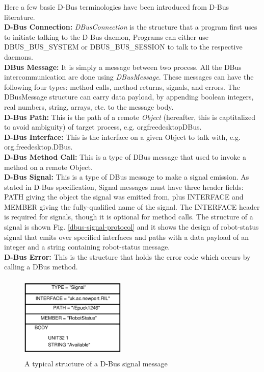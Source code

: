 \documentclass{ifacconf}
\begin{document}
Here a few basic D-Bus terminologies have been   introduced from D-Bus literature.\\
\textbf{D-Bus Connection: }
\textit{DBusConnection} is the structure that a program first uses to initiate talking to the D-Bus daemon,  Programs can either use DBUS\_BUS\_SYSTEM or DBUS\_BUS\_SESSION to talk to the respective daemons.\\
\textbf{DBus Message: }
It is simply a message between two process. All the DBus intercommunication are done using \textit{DBusMessage}. These messages can have the following four types: method calls, method returns, signals, and errors. The DBusMessage structure can carry data payload, by appending boolean integers, real numbers, string, arrays, etc. to the message body.\\ 
\textbf{D-Bus Path: }
This is the path of a remote \textit{Object} (hereafter, this is captitalized to avoid ambiguity) of target process, e.g.  \/org\/freedesktop\/DBus.\\
\textbf{D-Bus Interface: }
This is the interface on a given Object to talk with, e.g. org.freedesktop.DBus.\\
\textbf{D-Bus Method Call: }
This is a type  of DBus message that used to invoke a method on a remote Object.\\
\textbf{D-Bus Signal: }
This is a type of DBus message to make a signal emission.  As stated in D-Bus specification, Signal messages must have three header fields: PATH giving the object the signal was emitted from, plus INTERFACE and MEMBER giving the fully-qualified name of the signal. The INTERFACE header is required for signals, though it is optional for method calls. The structure of a signal is shown Fig. \ref{dbus-signal-protocol} and  it shows the design of robot-status signal that emits over specified interfaces and paths with a data payload of an integer and a string containing robot-status message.\\
\textbf{D-Bus Error: }
This is the structure that holds the error code which occurs by calling a DBus method.
\begin{figure}
\begin{center}
\includegraphics[width=5cm,height=4cm]{./dia-files/dbus-signal-protocol}    %
\caption{A typical structure of a D-Bus signal message} 
\label{fig:abstract-arch}
\end{center}
\end{figure}
\end{document}

